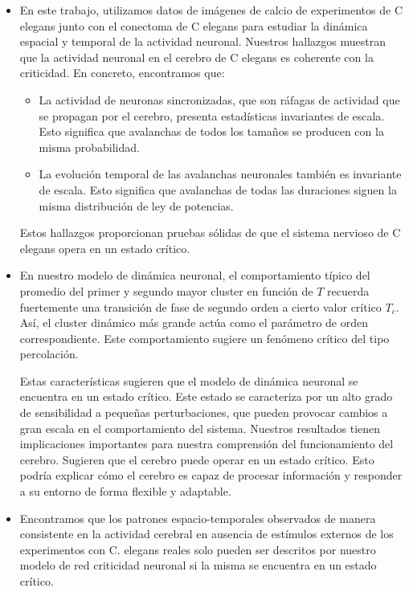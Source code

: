 \begin{itemize}
	
\item 	En este trabajo, utilizamos datos de imágenes de calcio de experimentos de C elegans junto con el conectoma de C elegans para estudiar la dinámica espacial y temporal de la actividad neuronal. Nuestros hallazgos muestran que la actividad neuronal en el cerebro de C elegans es coherente con la criticidad. En concreto, encontramos que:

\begin{itemize}
\item La actividad de neuronas sincronizadas, que son ráfagas de actividad que se propagan por el cerebro, presenta estadísticas invariantes de escala. Esto significa que avalanchas de todos los tamaños se producen con la misma probabilidad.
\item La evolución temporal de las avalanchas neuronales también es invariante de escala. Esto significa que avalanchas de todas las duraciones siguen la misma distribución de ley de potencias.
\end{itemize}
	Estos hallazgos proporcionan pruebas sólidas de que el sistema nervioso de C elegans opera en un estado crítico. 
	
\item En nuestro modelo de dinámica neuronal, el comportamiento típico del promedio del primer y segundo mayor cluster en función de $T$ recuerda fuertemente una transición de fase de segundo orden a cierto valor crítico $T_c.$ Así, el cluster dinámico más grande actúa como el parámetro de orden correspondiente. Este comportamiento sugiere un fenómeno crítico del tipo percolación.

Estas características sugieren que el modelo de dinámica neuronal se encuentra en un estado crítico.   Este estado se caracteriza por un alto grado de sensibilidad a pequeñas perturbaciones, que pueden provocar cambios a gran escala en el comportamiento del sistema.
Nuestros resultados tienen implicaciones importantes para nuestra comprensión del funcionamiento del cerebro. Sugieren que el cerebro puede operar en un estado crítico. Esto podría explicar cómo el cerebro es capaz de procesar información y responder a su entorno de forma flexible y adaptable.

\item Encontramos que los patrones espacio-temporales observados de manera consistente en la actividad cerebral en ausencia de estímulos externos de los experimentos con C. elegans reales solo pueden ser descritos por nuestro modelo de red criticidad neuronal  si la misma se encuentra en un estado crítico.


\end{itemize}
